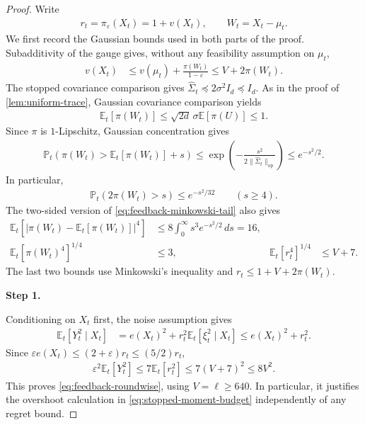 \documentclass[11pt]{article}
\newcommand{\proofstepinline}[1]{%
    {\sffamily\bfseries\color{blue!55!black}Step #1.}\enspace
}
\newcommand{\E}{\mathbb E}
\newcommand{\Pp}{\mathbb P}
\newcommand{\op}{\mathrm{op}}
\newcommand{\1}{\mathbf 1}
\newcommand{\eps}{\varepsilon}
\begin{document}
\begin{proof}
    Write
    \begin{align}
        r_t=\pi_\eps(X_t)=1+v(X_t),
        \qquad W_t=X_t-\mu_t.
    \end{align}
    We first record the Gaussian bounds used in both parts of the proof.
    Subadditivity of the gauge gives, without any feasibility assumption
    on $\mu_t$,
    \begin{align}
        v(X_t)
         & \leq v(\mu_t)+\frac{\pi(W_t)}{1-\eps}
        \leq V+2\pi(W_t).
        \label{eq:feedback-v-minkowski}
    \end{align}
    The stopped covariance comparison gives
    $\widehat\Sigma_t\preceq2\sigma^2I_d\preceq I_d$. As in the proof of
    \cref{lem:uniform-trace}, Gaussian covariance comparison yields
    \begin{align}
        \E_t[\pi(W_t)]
        \leq\sqrt{2d}\,\sigma\E[\pi(U)]\leq1.
        \label{eq:feedback-minkowski-mean}
    \end{align}
    Since $\pi$ is $1$-Lipschitz, Gaussian concentration gives
    \begin{align}
        \Pp_t\left(\pi(W_t)>\E_t[\pi(W_t)]+s\right)
        \leq\exp\left(-\frac{s^2}{2\|\widehat\Sigma_t\|_{\op}}\right)
        \leq e^{-s^2/2}.
        \label{eq:feedback-minkowski-tail}
    \end{align}
    In particular,
    \begin{align}
        \Pp_t(2\pi(W_t)>s)\leq e^{-s^2/32}
        \qquad(s\geq4).
        \label{eq:feedback-v-tail}
    \end{align}
    The two-sided version of \eqref{eq:feedback-minkowski-tail} also gives
    \begin{align}
        \E_t\left[\left|\pi(W_t)-\E_t[\pi(W_t)]\right|^4\right]
                               & \leq8\int_0^\infty s^3e^{-s^2/2}\,ds=16,
        \\
        \E_t[\pi(W_t)^4]^{1/4} & \leq3,
                               & \E_t[r_t^4]^{1/4}                        & \leq V+7.
        \label{eq:feedback-gauge-moments}
    \end{align}
    The last two bounds use Minkowski's inequality and
    $r_t\leq1+V+2\pi(W_t)$.

    \proofstepinline{1}
    Conditioning on $X_t$ first, the noise assumption gives
    \begin{align}
        \E_t[Y_t^2\mid X_t]
         & =e(X_t)^2+r_t^2\E_t[\xi_t^2\mid X_t]
        \leq e(X_t)^2+r_t^2.
        \label{eq:Y2-conditional-simple}
    \end{align}
    Since $\eps e(X_t)\leq(2+\eps)r_t\leq(5/2)r_t$,
    \begin{align}
        \eps^2\E_t[Y_t^2]
        \leq7\E_t[r_t^2]
        \leq7(V+7)^2
        \leq8V^2.
    \end{align}
    This proves \eqref{eq:feedback-roundwise}, using $V=\ell\geq640$.
    In particular, it justifies the overshoot calculation in
    \eqref{eq:stopped-moment-budget} independently of any regret bound.


\end{proof}
\end{document}
